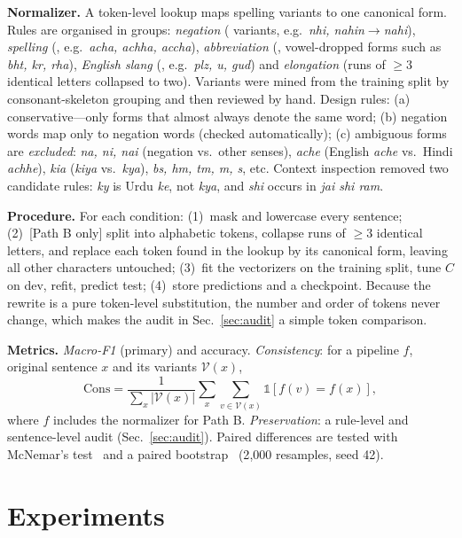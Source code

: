 \documentclass[10pt,twocolumn,letterpaper]{article}
\begin{document}
\textbf{Normalizer.} A token-level lookup maps spelling variants to one canonical form. Rules are organised in groups: \emph{negation} (\GrpNeg{} variants, e.g.\ \emph{nhi, nahin}$\to$\emph{nahi}), \emph{spelling} (\GrpSpell, e.g.\ \emph{acha, achha, accha}), \emph{abbreviation} (\GrpAbbr, vowel-dropped forms such as \emph{bht, kr, rha}), \emph{English slang} (\GrpSlang, e.g.\ \emph{plz, u, gud}) and \emph{elongation} (runs of $\ge3$ identical letters collapsed to two). Variants were mined from the training split by consonant-skeleton grouping and then reviewed by hand. Design rules: (a) conservative---only forms that almost always denote the same word; (b) negation words map only to negation words (checked automatically); (c) ambiguous forms are \emph{excluded}: \emph{na, ni, nai} (negation vs.\ other senses), \emph{ache} (English \emph{ache} vs.\ Hindi \emph{achhe}), \emph{kia} (\emph{kiya} vs.\ \emph{kya}), \emph{bs, hm, tm, m, s}, etc. Context inspection removed two candidate rules: \emph{ky} is Urdu \emph{ke}, not \emph{kya}, and \emph{shi} occurs in \emph{jai shi ram}.

\textbf{Procedure.} For each condition: (1)~mask and lowercase every sentence; (2)~[Path B only] split into alphabetic tokens, collapse runs of $\ge3$ identical letters, and replace each token found in the lookup by its canonical form, leaving all other characters untouched; (3)~fit the vectorizers on the training split, tune $C$ on dev, refit, predict test; (4)~store predictions and a checkpoint. Because the rewrite is a pure token-level substitution, the number and order of tokens never change, which makes the audit in Sec.~\ref{sec:audit} a simple token comparison.

\textbf{Metrics.} \emph{Macro-F1} (primary) and accuracy. \emph{Consistency}: for a pipeline $f$, original sentence $x$ and its variants $\mathcal V(x)$,
\begin{equation}
\mathrm{Cons}=\frac{1}{\sum_x|\mathcal V(x)|}\sum_{x}\sum_{v\in\mathcal V(x)}\mathbb 1\!\left[f(v)=f(x)\right],
\end{equation}
where $f$ includes the normalizer for Path B. \emph{Preservation}: a rule-level and sentence-level audit (Sec.~\ref{sec:audit}). Paired differences are tested with McNemar's test~\cite{mcnemar1947note} and a paired bootstrap~\cite{efron1993bootstrap} (2{,}000 resamples, seed 42).

\section{Experiments}
\end{document}
